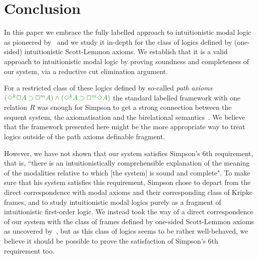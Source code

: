 \section{Conclusion}

In this paper we embrace the fully labelled approach to intuitionistic modal logic as pioneered by~\cite{maffezioli:etal:synthese13} and we study it in-depth for the class of logics defined by (one-sided) intuitionistic Scott-Lemmon axioms.
%
We establish that it is a valid approach to intuitionistic modal logic by proving soundness and completeness of our system, via a reductive cut elimination argument.

For a restricted class of these logics defined by so-called \emph{path axioms} $\fm{(\DIA^k\BOX A \IMP\BOX^m A) \AND (\DIA^k A \IMP \BOX^m\DIA A)}$ the standard labelled framework with one relation $R$ was enough for Simpson to get a strong connection between the sequent system, the axiomatisation and the birelational semantics~\cite{simpson:phd}.
%
%
We believe that the framework presented here might be the more appropriate way to treat logics outside of the path axioms definable fragment.

However, we have not shown that our system satisfies Simpson's 6th requirement, that is, ``there is an intuitionistically comprehensible explanation of the meaning of the modalities relative to which [the system] is sound and complete".
%
To make sure that his system satisfies this requirement, Simpson chose to depart from the direct correspondence with modal axioms and their corresponding class of Kripke frames, and to study intuitionistic modal logics purely as a fragment of intuitionistic first-order logic.
%
We instead took the way of a direct correspondence of our system with the class of frames defined by one-sided Scott-Lemmon axioms as uncovered by~\cite{plotkin:stirling:86}, but as this class of logics seems to be rather well-behaved, we believe it should be possible to prove the satisfaction of Simpson's 6th requirement too.


